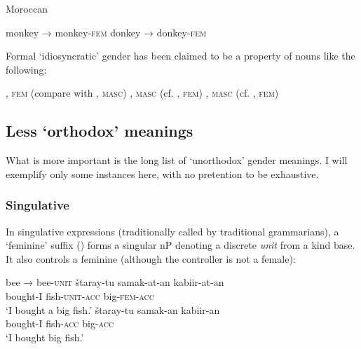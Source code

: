 \begin{exe}
  \ex\label{ex:fassi:4} Moroccan 
  \begin{xlist}
    \ex\label{ex:fassi:4a}  monkey  →  monkey-\textsc{fem} 
    \ex\label{ex:fassi:4b}  donkey  →  donkey-\textsc{fem} 
  \end{xlist}
\end{exe}

Formal `idiosyncratic' gender has been claimed to be a property of nouns like
the following:

\begin{exe}
  \ex\label{ex:fassi:5}
  \begin{xlist}
    \ex\label{ex:fassi:5a} , \textsc{fem} (compare with  , \textsc{masc})
    \ex\label{ex:fassi:5b} , \textsc{masc} (cf.  , \textsc{fem})
    \ex\label{ex:fassi:5c} , \textsc{masc} (cf.  , \textsc{fem})
  \end{xlist}
\end{exe}

\subsection{Less `orthodox' meanings}

What is more important is the long list of `unorthodox' gender meanings. I will
exemplify only some instances here, with no pretention to be exhaustive.

\subsubsection{Singulative}

In singulative expressions (traditionally called  
by  traditional grammarians), a `feminine' suffix () forms a
singular nP denoting a discrete \textit{unit} from a kind base. It also
controls a feminine  (although the controller is not a female):

\begin{exe}
  \ex\label{ex:fassi:6}
  \begin{xlist}
    \ex\label{ex:fassi:6a}  bee  →  bee-\textsc{unit} 
    \ex\label{ex:fassi:6b} \gll \v{s}taray-tu samak-at-an kabiir-at-an\\
    bought-I fish-\textsc{unit-acc} big-\textsc{fem-acc}\\
    \glt `I bought a big fish.'
    \ex\label{ex:fassi:6c} \gll \v{s}taray-tu samak-an kabiir-an\\
    bought-I fish-\textsc{acc} big-\textsc{acc}\\
    \glt `I bought big fish.'
  \end{xlist}
\end{exe}

